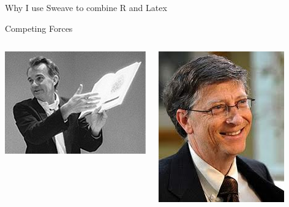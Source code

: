 \documentclass{beamer}
\begin{document}
\begin{frame}{Why I use Sweave to combine R and Latex}
 \begin{block}
   {Competing Forces}
\end{block}
\pause
\begin{columns}[t] 
\begin{center}
\includegraphics[scale=.4]{etufte}
\end{center}
\pause 
{}
\begin{center}
\includegraphics[scale=.4]{billgates}
\end{center}
\end{columns}
\end{frame}
\end{document}
